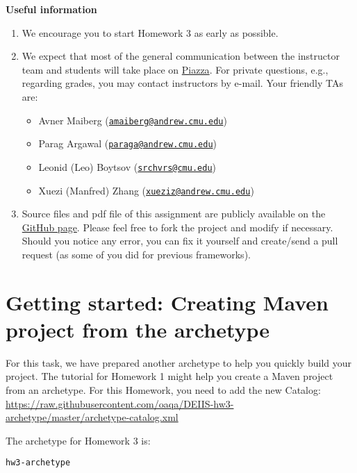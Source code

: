 \documentclass[oneside,11pt]{memoir}
\begin{document}
\textbf{Useful information}
\begin{enumerate}
\item We encourage you to start Homework 3 as early as possible.

\item 
We expect that most of the general communication between the instructor team and students will take place on 
\href{https://piazza.com/class/hyvsubeilei6dd}{Piazza}.
For private questions, e.g., regarding grades, you may contact instructors by e-mail.
Your friendly TAs are:
\begin{itemize}
\item Avner Maiberg (\href{mailto:amaiberg@andrew.cmu.edu}{\nolinkurl{amaiberg@andrew.cmu.edu}}) 
\item Parag Argawal (\href{mailto:paraga@andrew.cmu.edu}{\nolinkurl{paraga@andrew.cmu.edu}}) 
\item Leonid (Leo) Boytsov (\href{mailto:srchvrs@cmu.edu}{\nolinkurl{srchvrs@cmu.edu}})
\item Xuezi (Manfred) Zhang (\href{mailto:xueziz@andrew.cmu.edu}{\nolinkurl{xueziz@andrew.cmu.edu}}) 
\end{itemize}

\item Source files and pdf file of this assignment are publicly available on 
the  \href{http://github.com/amaiberg/software-engineering-preliminary}{GitHub page}.
Please feel free to fork the project and modify if necessary.
Should you notice any error, you can fix it yourself and create/send a pull request (as some
of you did for previous frameworks).  

\end{enumerate}
\hspace{-0.1\textwidth}

\chapter*{Getting started: Creating Maven project from the archetype}
For this task, we have prepared another archetype to help you quickly build your project. 
The tutorial for Homework 1 might help you create a Maven project from an archetype.
For this Homework, you need to add the new Catalog:
\url{https://raw.githubusercontent.com/oaqa/DEIIS-hw3-archetype/master/archetype-catalog.xml}

The archetype for Homework 3 is:

\begin{center}\texttt{hw3-archetype}\end{center}
\end{document}
